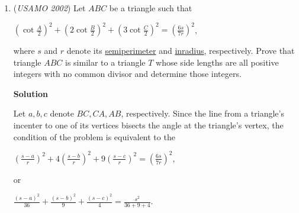 \begin{enumerate}
 where each of the $a_i$ is an element of $S$.  We color each of the $a_i$ red and all the other elements of $S$ blue.  We color the empty set blue, and we color any other set the color of its largest element.  This satisfies the problem's first two conditions, as the largest element of the union of two red (or blue) sets will have a red (or blue) number as its largest element.  In addition, for each integer $n \in S$, there are $2^{n}$ subsets of $S$ with $n$ as a maximal element, so $\sum_{i=1}^{k} 2^{a_i} = N$ subsets of $S$ are colored red, as desired.

 
<i>Alternate solutions are always welcome. If you have a different, elegant solution to this problem, please \href{https://artofproblemsolving.com/wiki/index.php?title=2002\_USAMO\_Problems/Problem\_1&action=edit}{add it} to this page.</i>



	\item (\textit{USAMO 2002}) Let $ABC$ be a triangle such that


 
$\left( \cot \frac{A}{2} \right)^2 + \left( 2 \cot \frac{B}{2} \right)^2 + \left( 3 \cot \frac{C}{2} \right)^2 = \left( \frac{6s}{7r} \right)^2$,


 


 where $s$ and $r$ denote its \href{https://artofproblemsolving.com/wiki/index.php?title=Semiperimeter}{semiperimeter} and \href{https://artofproblemsolving.com/wiki/index.php?title=Inradius}{inradius}, respectively.  Prove that triangle $ABC$ is similar to a triangle $T$ whose side lengths are all positive integers with no common divisor and determine those integers.


 



\textbf{Solution}

Let $a,b,c$ denote $BC, CA, AB$, respectively.  Since the line from a triangle's incenter to one of its vertices bisects the angle at the triangle's vertex, the condition of the problem is equivalent to the

 $\left( \frac{s-a}{r} \right)^2 + 4\left( \frac{s-b}{r} \right)^2 + 9\left( \frac{s-c}{r} \right)^2 = \left( \frac{6s}{7r} \right)^2$,

 

 or

 $\frac{(s-a)^2}{36} + \frac{(s-b)^2}{9} + \frac{(s-c)^2}{4} = \frac{s^2}{36 + 9 + 4}$.

 


\end{enumerate}
